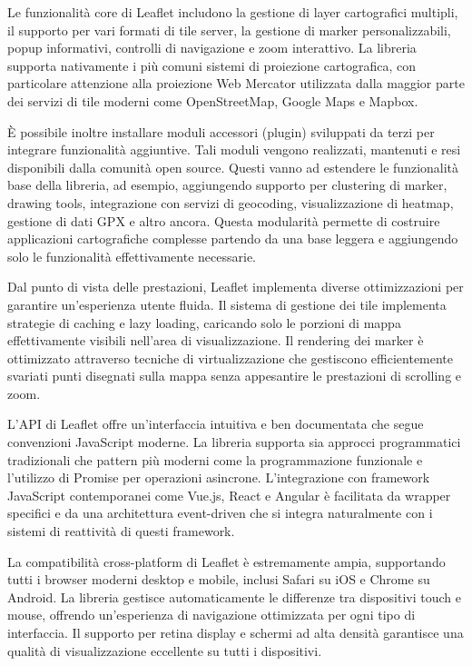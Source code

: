Le funzionalità core di Leaflet includono la gestione di layer cartografici multipli, il supporto per vari formati di tile server, la gestione di marker personalizzabili, popup informativi, controlli di navigazione e zoom interattivo. La libreria supporta nativamente i più comuni sistemi di proiezione cartografica, con particolare attenzione alla proiezione Web Mercator utilizzata dalla maggior parte dei servizi di tile moderni come OpenStreetMap, Google Maps e Mapbox.

È possibile inoltre installare moduli accessori (plugin) sviluppati da terzi per integrare funzionalità aggiuntive. Tali moduli vengono realizzati, mantenuti e resi disponibili dalla comunità open source. Questi vanno ad estendere le funzionalità base della libreria, ad esempio, aggiungendo supporto per clustering di marker, drawing tools, integrazione con servizi di geocoding, visualizzazione di heatmap, gestione di dati GPX e altro ancora. Questa modularità permette di costruire applicazioni cartografiche complesse partendo da una base leggera e aggiungendo solo le funzionalità effettivamente necessarie.

Dal punto di vista delle prestazioni, Leaflet implementa diverse ottimizzazioni per garantire un'esperienza utente fluida. Il sistema di gestione dei tile implementa strategie di caching e lazy loading, caricando solo le porzioni di mappa effettivamente visibili nell'area di visualizzazione. Il rendering dei marker è ottimizzato attraverso tecniche di virtualizzazione che gestiscono efficientemente svariati punti disegnati sulla mappa senza appesantire le prestazioni di scrolling e zoom.

L'API di Leaflet offre un'interfaccia intuitiva e ben documentata che segue convenzioni JavaScript moderne. La libreria supporta sia approcci programmatici tradizionali che pattern più moderni come la programmazione funzionale e l'utilizzo di Promise per operazioni asincrone. L'integrazione con framework JavaScript contemporanei come Vue.js, React e Angular è facilitata da wrapper specifici e da una architettura event-driven che si integra naturalmente con i sistemi di reattività di questi framework.

La compatibilità cross-platform di Leaflet è estremamente ampia, supportando tutti i browser moderni desktop e mobile, inclusi Safari su iOS e Chrome su Android. La libreria gestisce automaticamente le differenze tra dispositivi touch e mouse, offrendo un'esperienza di navigazione ottimizzata per ogni tipo di interfaccia. Il supporto per retina display e schermi ad alta densità garantisce una qualità di visualizzazione eccellente su tutti i dispositivi.

